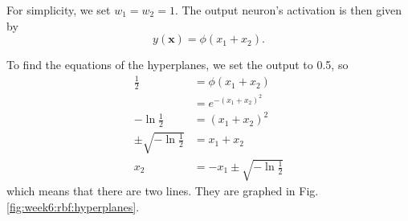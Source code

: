 \documentclass{article}
\let\vec\mathbf
\begin{document}
For simplicity, we set $w_1=w_2=1$. 
The output neuron's activation is then given by 
\begin{equation*}
    y(\vec{x}) = \phi(x_1 + x_2).
\end{equation*}

To find the equations of the hyperplanes, we set the output to 0.5, so
\begin{align*}
    \frac{1}{2} &= \phi(x_1 + x_2) \\
    &= e^{-(x_1 + x_2)^2} \\
    -\ln \frac{1}{2} &= (x_1 + x_2)^2 \\
    \pm\sqrt{-\ln \frac{1}{2}} &= x_1 + x_2 \\
    x_2 &= -x_1 \pm\sqrt{-\ln \frac{1}{2}}
\end{align*}
which means that there are two lines. They are graphed in Fig. \ref{fig:week6:rbf:hyperplanes}.
\end{document}
